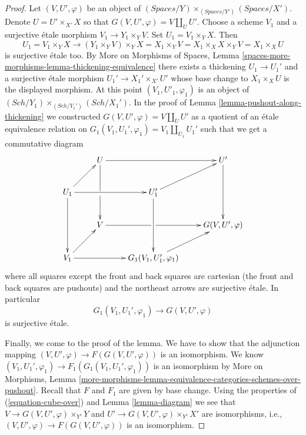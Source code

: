 \documentclass{stacks-project}
\theoremstyle{plain}
\theoremstyle{definition}
\theoremstyle{remark}
\numberwithin{equation}{subsection}
\def\Sch{\mathit{Sch}}
\begin{document}
\begin{proof}
\medskip\noindent
Let $(V, U', \varphi)$ be an object of
$(\textit{Spaces}/Y) \times_{(\textit{Spaces}/Y')} (\textit{Spaces}/X')$.
Denote $U = U' \times_{X'} X$ so that $G(V, U', \varphi) = V \amalg_U U'$.
Choose a scheme $V_1$ and a surjective \'etale morphism
$V_1 \to Y_1 \times_Y V$. Set $U_1 = V_1 \times_Y X$. Then
$$
U_1 = V_1 \times_Y X
\longrightarrow
(Y_1 \times_Y V) \times_Y X =
X_1 \times_Y V = X_1 \times_X X \times_Y V = X_1 \times_X U
$$
is surjective \'etale too. By
More on Morphisms of Spaces, Lemma
\ref{spaces-more-morphisms-lemma-thickening-equivalence}
there exists a thickening $U_1 \to U_1'$ and a surjective \'etale morphism
$U_1' \to X_1' \times_{X'} U'$ whose base change to $X_1 \times_X U$ is the
displayed morphism. At this point $(V_1, U'_1, \varphi_1)$ is an object of
$(\Sch/Y_1) \times_{(\Sch/Y_1')} (\Sch/X_1')$. In the proof of
Lemma \ref{lemma-pushout-along-thickening} we constructed
$G(V, U', \varphi) = V \amalg_U U'$ as a quotient of an \'etale equivalence
relation on $G_1(V_1, U_1', \varphi_1) = V_1 \amalg_{U_1} U_1'$
such that we get a commutative diagram
\begin{equation}
\label{equation-cube-over}
\vcenter{
\xymatrix{
& U \ar[rr] \ar'[d][dd] & & U' \ar[dd] \\
U_1 \ar[rr] \ar[dd] \ar[ru] & & U_1' \ar[dd] \ar[ru] & \\
& V \ar'[r][rr] & & G(V, U', \varphi) \\
V_1 \ar[rr] \ar[ru] & & G_1(V_1, U_1', \varphi_1) \ar[ru]
}
}
\end{equation}
where all squares except the front and back squares are cartesian
(the front and back squares are pushouts) and the northeast arrows
are surjective \'etale. In particular
$$
G_1(V_1, U_1', \varphi_1) \to G(V, U', \varphi)
$$
is surjective \'etale.

\medskip\noindent
Finally, we come to the proof of the lemma. We have to show that the adjunction
mapping $(V, U', \varphi) \to F(G(V, U', \varphi))$ is an isomorphism. We know
$(V_1, U_1', \varphi_1) \to F_1(G_1(V_1, U_1', \varphi_1))$ is an isomorphism
by More on Morphisms, Lemma
\ref{more-morphisms-lemma-equivalence-categories-schemes-over-pushout}.
Recall that $F$ and $F_1$ are given by base change.
Using the properties of (\ref{equation-cube-over})
and Lemma \ref{lemma-diagram}
we see that
$V \to G(V, U', \varphi) \times_{Y'} Y$ and
$U' \to G(V, U', \varphi) \times_{Y'} X'$ are isomorphisms, i.e.,
$(V, U', \varphi) \to F(G(V, U', \varphi))$ is an isomorphism.
\end{proof}
\end{document}
